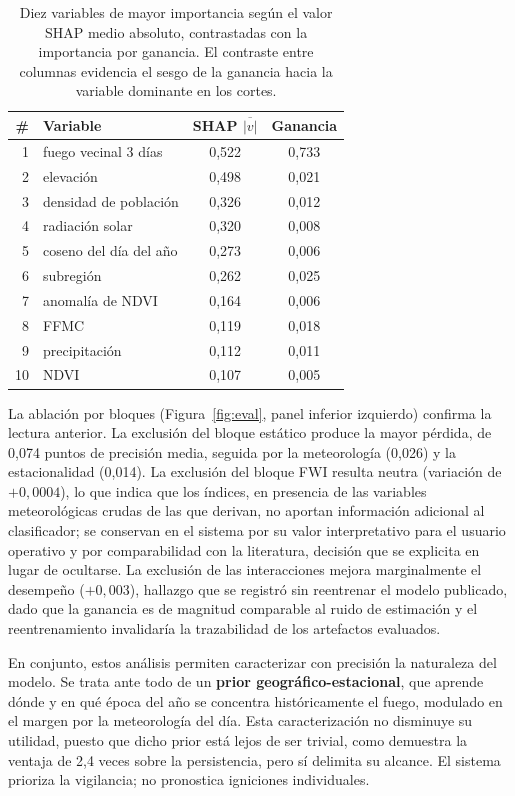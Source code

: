 \documentclass[11pt,a4paper]{article}
\begin{document}
\begin{table}[H]
\centering\small
\begin{tabular}{@{}rlcc@{}}
\toprule
\# & \textbf{Variable} & \textbf{SHAP $\overline{|v|}$} & \textbf{Ganancia} \\
\midrule
1 & fuego vecinal 3 días & 0,522 & 0,733 \\
2 & elevación & 0,498 & 0,021 \\
3 & densidad de población & 0,326 & 0,012 \\
4 & radiación solar & 0,320 & 0,008 \\
5 & coseno del día del año & 0,273 & 0,006 \\
6 & subregión & 0,262 & 0,025 \\
7 & anomalía de NDVI & 0,164 & 0,006 \\
8 & FFMC & 0,119 & 0,018 \\
9 & precipitación & 0,112 & 0,011 \\
10 & NDVI & 0,107 & 0,005 \\
\bottomrule
\end{tabular}
\caption{Diez variables de mayor importancia según el valor SHAP medio
absoluto, contrastadas con la importancia por ganancia. El contraste entre
columnas evidencia el sesgo de la ganancia hacia la variable dominante en
los cortes.}
\label{tab:shap}
\end{table}

La ablación por bloques (Figura~\ref{fig:eval}, panel inferior izquierdo)
confirma la lectura anterior. La exclusión del bloque estático produce la
mayor pérdida, de 0,074 puntos de precisión media, seguida por la
meteorología (0,026) y la estacionalidad (0,014). La exclusión del bloque
FWI resulta neutra (variación de $+0{,}0004$), lo que indica que los
índices, en presencia de las variables meteorológicas crudas de las que
derivan, no aportan información adicional al clasificador; se conservan en
el sistema por su valor interpretativo para el usuario operativo y por
comparabilidad con la literatura, decisión que se explicita en lugar de
ocultarse. La exclusión de las interacciones mejora marginalmente el
desempeño ($+0{,}003$), hallazgo que se registró sin reentrenar el modelo
publicado, dado que la ganancia es de magnitud comparable al ruido de
estimación y el reentrenamiento invalidaría la trazabilidad de los
artefactos evaluados.

En conjunto, estos análisis permiten caracterizar con precisión la
naturaleza del modelo. Se trata ante todo de un \textbf{prior
geográfico-estacional}, que aprende dónde y en qué época del año se
concentra históricamente el fuego, modulado en el margen por la
meteorología del día. Esta caracterización no disminuye su utilidad, puesto
que dicho prior está lejos de ser trivial, como demuestra la ventaja de 2,4
veces sobre la persistencia, pero sí delimita su alcance. El sistema
prioriza la vigilancia; no pronostica igniciones individuales.
\end{document}
